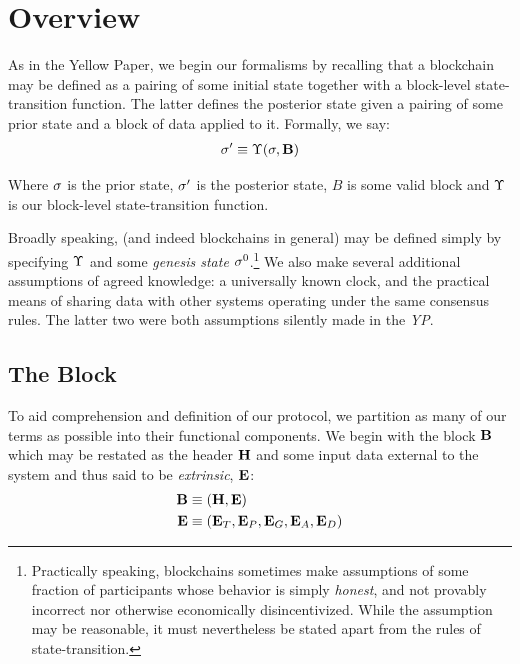 \section{Overview}\label{sec:overview}

As in the Yellow Paper, we begin our formalisms by recalling that a blockchain may be defined as a pairing of some initial state together with a block-level state-transition function. The latter defines the posterior state given a pairing of some prior state and a block of data applied to it. Formally, we say:
\begin{align}\label{eq:statetransition}
\sigma' \equiv \Upsilon(\sigma, \mathbf{B})
\end{align}

Where $\sigma$ is the prior state, $\sigma'$ is the posterior state, $B$ is some valid block and $\Upsilon$ is our block-level state-transition function.

Broadly speaking, \Jam (and indeed blockchains in general) may be defined simply by specifying $\Upsilon$ and some \emph{genesis state} $\sigma^0$.\footnote{Practically speaking, blockchains sometimes make assumptions of some fraction of participants whose behavior is simply \emph{honest}, and not provably incorrect nor otherwise economically disincentivized. While the assumption may be reasonable, it must nevertheless be stated apart from the rules of state-transition.} We also make several additional assumptions of agreed knowledge: a universally known clock, and the practical means of sharing data with other systems operating under the same consensus rules. The latter two were both assumptions silently made in the \emph{YP}.

\subsection{The Block}

To aid comprehension and definition of our protocol, we partition as many of our terms as possible into their functional components. We begin with the block $\mathbf{B}$ which may be restated as the header $\mathbf{H}$ and some input data external to the system and thus said to be \emph{extrinsic}, $\mathbf{E}$:
\begin{align}
  \label{eq:block}\block &\equiv \tup{\header, \extrinsic} \\
  \label{eq:extrinsic}\extrinsic &\equiv \tup{\xttickets, \xtpreimages, \xtguarantees, \xtassurances, \xtdisputes}
\end{align}

